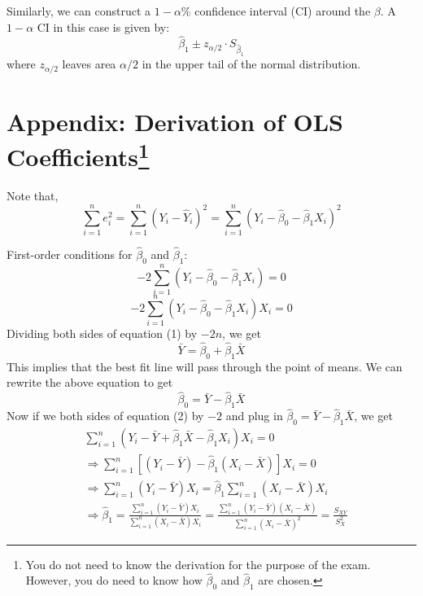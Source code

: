 \documentclass{./../../Latex/handout}
\begin{document}
Similarly, we can construct a $1-\alpha$\% confidence interval (CI) around the $\beta$. A $1-\alpha$ CI in this case is given by:
$$ \hat{\beta}_1 \pm z_{\alpha/2} \cdot S_{\hat{\beta}_1} $$
where $z_{\alpha/2}$ leaves area $\alpha/2$ in the upper tail of the normal distribution. 


\newpage
\section*{Appendix: Derivation of OLS Coefficients\footnote{You do not need to know the derivation for the purpose of the exam. However, you do need to know how $\hat{\beta}_0$ and $\hat{\beta}_1$ are chosen.}}
Note that, $$ \sum_{i=1}^n e^2_i = \sum_{i=1}^n(Y_i - \hat{Y}_i)^2 =   \sum_{i=1}^n(Y_i - \hat{\beta}_0 - \hat{\beta}_1 X_i)^2 $$ 

First-order conditions for $\hat{\beta}_0$ and $\hat{\beta}_1$: 
\begin{equation} -2\sum_{i=1}^n (Y_i - \hat{\beta}_0 - \hat{\beta}_1 X_i) = 0 \end{equation}
\begin{equation}  -2\sum_{i=1}^n (Y_i - \hat{\beta}_0 - \hat{\beta}_1 X_i)X_i = 0 \end{equation}
Dividing both sides of equation (1) by $-2n$, we  get 
 $$ \bar{Y} = \hat{\beta}_0 + \hat{\beta}_1 \bar{X} $$
 This implies that the best fit line will pass through the point of means. We can rewrite the above equation to get 
 $$ \hat{\beta}_0 = \bar{Y}-\hat{\beta}_1 \bar{X} $$
 Now if we both sides of equation (2) by $-2$ and plug in $ \hat{\beta}_0 = \bar{Y}-\hat{\beta}_1 \bar{X} $, we get
 \begin{align*}
 & \sum_{i=1}^n (Y_i - \bar{Y}+\hat{\beta}_1 \bar{X} - \hat{\beta}_1 X_i)X_i = 0 \\
 & \Rightarrow   \sum_{i=1}^n [(Y_i - \bar{Y})-\hat{\beta}_1(X_i-\bar{X})]X_i = 0 \\
&  \Rightarrow  \sum_{i=1}^n (Y_i - \bar{Y})X_i = \hat{\beta}_1   \sum_{i=1}^n (X_i-\bar{X})X_i \\
& \Rightarrow \hat{\beta}_1 = \frac{ \sum_{i=1}^n(Y_i - \bar{Y})X_i}{ \sum_{i=1}^n(X_i - \bar{X})X_i } = \frac{ \sum_{i=1}^n(Y_i - \bar{Y})(X_i-\bar{X})}{ \sum_{i=1}^n(X_i - \bar{X})^2 } = \frac{S_{XY}}{S^2_X}
 \end{align*}
\end{document}
